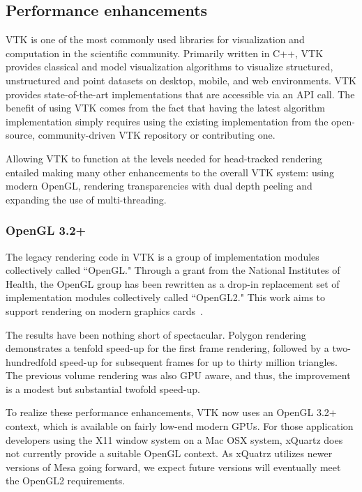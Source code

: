 \subsection{Performance enhancements}

VTK is one of the most commonly used libraries for visualization and computation in the scientific community.
Primarily written in C++, VTK provides classical and model visualization algorithms to visualize structured, unstructured and point datasets on desktop, mobile, and web environments.
VTK provides state-of-the-art implementations that are accessible via an API call.
The benefit of using VTK comes from the fact that having the latest algorithm implementation simply requires using the existing implementation from the
open-source, community-driven VTK repository or contributing one.

Allowing VTK to function at the levels needed for head-tracked rendering entailed making
many other enhancements to the overall VTK system:
using modern OpenGL,
rendering transparencies with dual depth peeling and
expanding the use of multi-threading.

\subsubsection{OpenGL 3.2+}

The legacy rendering code in VTK is a group of implementation modules collectively called ``OpenGL."
Through a grant from the National Institutes of Health, the OpenGL group has
been rewritten as a drop-in replacement set of implementation modules
collectively called ``OpenGL2."
This work aims to support rendering on modern graphics cards~\cite{Hanwell:2015}.

The results have been nothing short of spectacular.
Polygon rendering demonstrates a tenfold speed-up for the first frame rendering, followed by a two-hundredfold speed-up for subsequent frames for up to thirty million triangles.
The previous volume rendering was also GPU aware, and thus, the improvement is a modest but substantial twofold speed-up. 

To realize these performance enhancements, VTK now uses an OpenGL 3.2+ context, which is available on fairly low-end modern GPUs.
For those application developers using the X11 window system on a Mac OSX system, xQuartz does not currently provide a suitable OpenGL context.
As xQuatrz utilizes newer versions of Mesa going forward, we expect future versions will eventually meet the OpenGL2 requirements.

